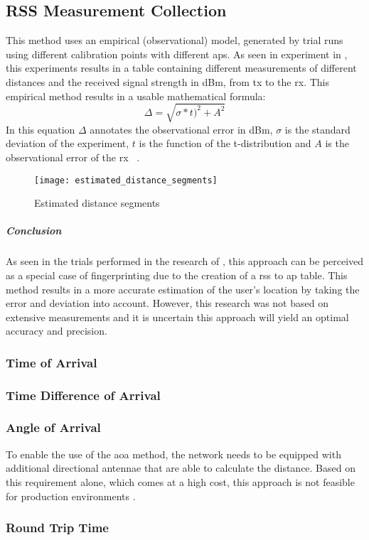 \subsection{RSS Measurement Collection}
This method uses an empirical (observational) model, generated by trial runs using different calibration points with different \acrlong{ap}s. As seen in experiment in \cite{Shchekotov}, this experiments results in a table containing different measurements of different distances and the received signal strength in dBm, from \acrlong{tx} to the \acrlong{rx}. This empirical method results in a usable mathematical formula:
\[
\Delta = \sqrt{\sigma * t)^2 + A^2}
\]
In this equation $\Delta$ annotates the observational error in dBm, $\sigma$ is the standard deviation of the experiment, $t$ is the function of the t-distribution and $A$ is the observational error of the \acrfull{rx} ~\cite[p.178]{Shchekotov}.
\begin{figure}[h!]
\centering
\texttt{[image: estimated\_distance\_segments]}
\caption{Estimated distance segments ~\cite[p.179]{Shchekotov}}
\label{fig:estimated_distance_segments}
\end{figure}
\subparagraph{Conclusion}
As seen in the trials performed in the research of \cite{Shchekotov}, this approach can be perceived as a special case of fingerprinting due to the creation of a \acrshort{rss} to \acrshort{ap} table. This method results in a more accurate estimation of the user's location by taking the error and deviation into account. However, this research was not based on extensive measurements and it is uncertain this approach will yield an optimal accuracy and precision.
\subsubsection{Time of Arrival}
\subsubsection{Time Difference of Arrival}
\subsubsection{Angle of Arrival}
To enable the use of the \acrshort{aoa} method, the network needs to be equipped with additional directional antennae that are able to calculate the distance. Based on this requirement alone, which comes at a high cost, this approach is not feasible for production environments .
\subsubsection{Round Trip Time}
